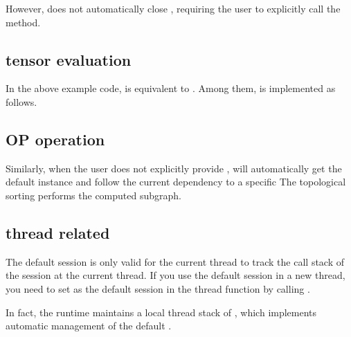 \begin{content}
\begin{content}
However,  does not automatically close , requiring the user to explicitly call the  method.

\subsection{tensor evaluation}

In the above example code,  is equivalent to . Among them,  is implemented as follows.


\subsection{OP operation}

Similarly, when the user does not explicitly provide ,  will automatically get the default  instance and follow the current  dependency to a specific The topological sorting performs the computed subgraph.


\subsection{thread related}

The default session is only valid for the current thread to track the call stack of the session at the current thread. If you use the default session in a new thread, you need to set  as the default session in the thread function by calling .

In fact, the  runtime maintains a local thread stack of , which implements automatic management of the default .


\end{content}
\end{content}
